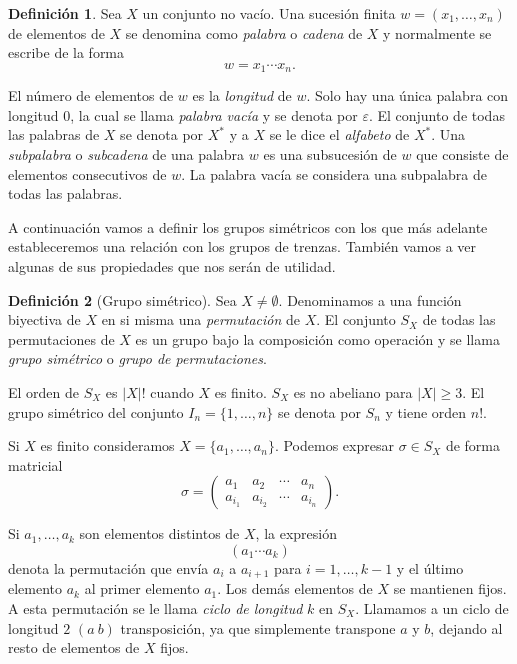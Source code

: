 \documentclass[12pt]{article}
\theoremstyle{definition}
\newtheorem{defi}{Definición}[section]
\begin{document}
\begin{defi}
Sea $X$ un conjunto no vacío. Una sucesión finita $w = (x_1,\ldots,x_n)$ de elementos de $X$ se denomina como \textit{palabra} o \textit{cadena} de $X$ y normalmente se escribe de la forma
$$w = x_1\cdots x_n.$$

El número de elementos de $w$ es la \textit{longitud} de $w$. Solo hay una única palabra con longitud 0, la cual se llama \textit{palabra vacía} y se denota por $\varepsilon$. El conjunto de todas las palabras de $X$ se denota por $X^*$ y a $X$ se le dice el \textit{alfabeto} de $X^*$. Una \textit{subpalabra} o \textit{subcadena} de una palabra $w$ es una subsucesión de $w$ que consiste de elementos consecutivos de $w$. La palabra vacía se considera una subpalabra de todas las palabras.
\end{defi}
A continuación vamos a definir los grupos simétricos con los que más adelante estableceremos una relación con los grupos de trenzas. También vamos a ver algunas de sus propiedades que nos serán de utilidad.

\begin{defi}[Grupo simétrico]
Sea $X \neq \emptyset$. Denominamos a una función biyectiva de $X$ en si misma una \textit{permutación} de $X$. El conjunto $S_X$ de todas las permutaciones de $X$ es un grupo bajo la composición como operación y se llama \textit{grupo simétrico} o \textit{grupo de permutaciones}.
\end{defi}

El orden de $S_X$ es $|X|!$ cuando $X$ es finito. $S_X$ es no abeliano para $|X|\geq 3$. El grupo simétrico del conjunto $I_n=\{1,\ldots,n\}$ se denota por $S_n$ y tiene orden $n!$.

Si $X$ es finito consideramos $X = \{a_1,\ldots,a_n\}$. Podemos expresar $\sigma\in S_X$ de forma matricial
$$\sigma = 
\begin{pmatrix}
a_1 & a_2 & \cdots & a_n\\
a_{i_1} & a_{i_2} & \cdots & a_{i_n}
\end{pmatrix}
.$$

Si $a_1,\ldots,a_k$ son elementos distintos de $X$, la expresión
$$(a_1\cdots a_k)$$
denota la permutación que envía $a_i$ a $a_{i+1}$ para $i=1,\ldots,k-1$ y el último elemento $a_k$ al primer elemento $a_1$. Los demás elementos de $X$ se mantienen fijos. A esta permutación se le llama \textit{ciclo de longitud} $k$ en $S_X$. Llamamos a un ciclo de longitud $2$ $(a\ b)$ transposición, ya que simplemente transpone $a$ y $b$, dejando al resto de elementos de $X$ fijos.
\end{document}

